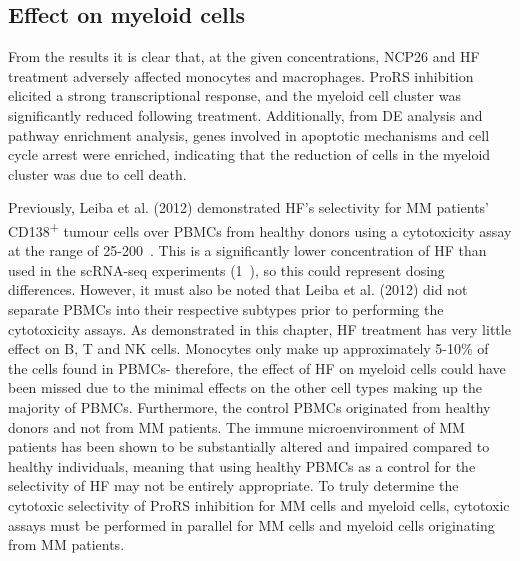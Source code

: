 \subsection{Effect on myeloid cells}
From the results it is clear that, at the given concentrations,  NCP26 and HF treatment adversely affected monocytes and macrophages.
ProRS inhibition elicited a strong transcriptional response, and the myeloid cell cluster was significantly reduced following treatment.
Additionally, from DE analysis and pathway enrichment analysis, genes involved in apoptotic mechanisms and cell cycle arrest were enriched, indicating that the reduction of cells in the myeloid cluster was due to cell death.

Previously, Leiba et al. (2012) demonstrated HF's selectivity for MM patients' CD138\textsuperscript{+} tumour cells over PBMCs from healthy donors\cite{leiba2012halofuginone} using a cytotoxicity assay at the range of 25-200\si{\nano\Molar}.
This is a significantly lower concentration of HF than used in the scRNA-seq experiments (1\si{\micro\Molar}), so this could represent dosing differences.
However, it must also be noted that Leiba et al. (2012) did not separate PBMCs into their respective subtypes prior to performing the cytotoxicity assays.
As demonstrated in this chapter, HF treatment has very little effect on B, T and NK cells.
Monocytes only make up approximately 5-10\% of the cells found in PBMCs- therefore, the effect of HF on myeloid cells could have been missed due to the minimal effects on the other cell types making up the majority of PBMCs.
Furthermore, the control PBMCs originated from healthy donors and not from MM patients.
The immune microenvironment of MM patients has been shown to be substantially altered and impaired compared to healthy individuals\cite{de2013analysis}, meaning that using healthy PBMCs as a control for the selectivity of HF may not be entirely appropriate.
To truly determine the cytotoxic selectivity of ProRS inhibition for MM cells and myeloid cells, cytotoxic assays must be performed in parallel for MM cells and myeloid cells originating from MM patients.

